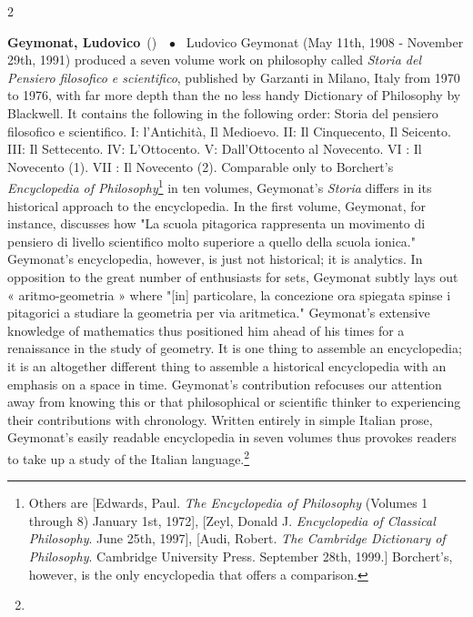 \documentclass[10pt,a4paper,twoside]{article} %
\newcommand{\entry}[4]{\markboth{#1}{#1}\textbf{#1}\ {(#2)}\ \textit{#3}\ $\bullet$\ {#4}}  %
\begin{document}
\begin{multicols}{2}
\entry{Geymonat, Ludovico} {} {} { Ludovico Geymonat (May 11th, 1908 - November 29th, 1991) produced a seven volume work on philosophy called \emph{Storia del Pensiero filosofico e scientifico}, published by Garzanti in Milano, Italy from 1970 to 1976, with far more depth than the no less handy Dictionary of Philosophy by Blackwell. It contains the following in the following order: Storia del pensiero filosofico e scientifico. I: l'Antichità, Il Medioevo. II: Il Cinquecento, Il Seicento. III: Il Settecento. IV: L'Ottocento. V: Dall'Ottocento al Novecento. VI : Il Novecento (1). VII : Il Novecento (2).  Comparable only to Borchert's \emph{Encyclopedia of Philosophy}\footnote{Others are [Edwards, Paul. \emph{The Encyclopedia of Philosophy} (Volumes 1 through 8) January 1st, 1972], [Zeyl, Donald J. \emph{Encyclopedia of Classical Philosophy}. June 25th, 1997], [Audi, Robert. \emph{The Cambridge Dictionary of Philosophy}. Cambridge University Press. September 28th, 1999.] Borchert's, however, is the only encyclopedia that offers a comparison.} in ten volumes, Geymonat's \emph{Storia} differs in its historical approach to the encyclopedia. In the first volume, Geymonat, for instance, discusses how "La scuola pitagorica rappresenta un movimento di pensiero di livello scientifico molto superiore a quello della scuola ionica." \newline \indent Geymonat's encyclopedia, however, is just not historical; it is analytics. In opposition to the great number of enthusiasts for sets, Geymonat subtly lays out « aritmo-geometria » where "[in] particolare, la concezione ora spiegata spinse i pitagorici a studiare la geometria per via aritmetica." Geymonat's extensive knowledge of mathematics thus positioned him ahead of his times for a renaissance in the study of geometry. \newline \indent It is one thing to assemble an encyclopedia; it is an altogether different thing to assemble a historical encyclopedia with an emphasis on a space in time. Geymonat's contribution refocuses our attention away from knowing this or that philosophical or scientific thinker to experiencing their contributions with chronology. Written entirely in simple Italian prose, Geymonat's easily readable encyclopedia in seven volumes thus provokes readers to take up a study of the Italian language.\footnote{}
}


\end{multicols}
\end{document}
